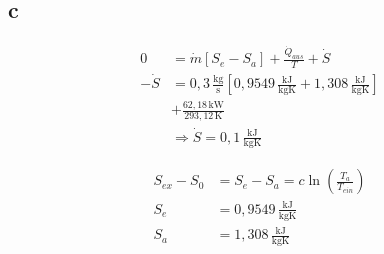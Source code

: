 

\subsection*{c}

\begin{align*}
0 &= \dot{m} \left[ S_e - S_a \right] + \frac{\dot{Q}_{aus}}{T} + \dot{S} \\
-\dot{S} &= 0,3 \, \frac{\text{kg}}{\text{s}} \left[ 0,9549 \, \frac{\text{kJ}}{\text{kgK}} + 1,308 \, \frac{\text{kJ}}{\text{kgK}} \right] \\
&+ \frac{62,18 \, \text{kW}}{293,12 \, \text{K}} \\
&\Rightarrow \dot{S} = 0,1 \, \frac{\text{kJ}}{\text{kgK}}
\end{align*}

\begin{align*}
S_{ex} - S_{0} &= S_{e} - S_{a} = c \ln \left( \frac{T_a}{T_{ein}} \right) \\
S_e &= 0,9549 \, \frac{\text{kJ}}{\text{kgK}} \\
S_a &= 1,308 \, \frac{\text{kJ}}{\text{kgK}}
\end{align*}